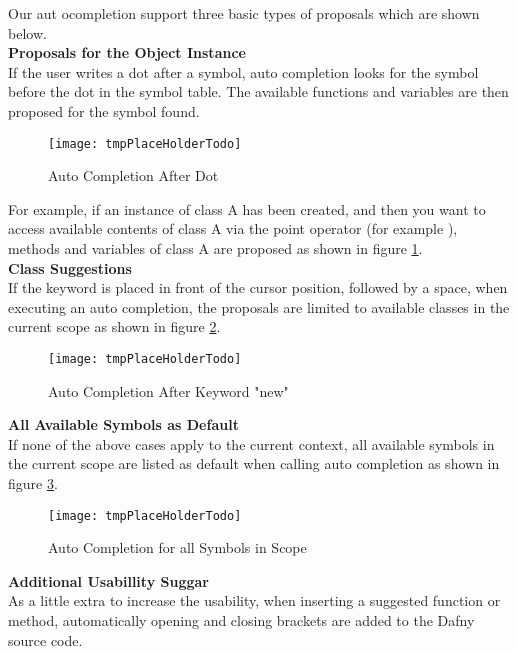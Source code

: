 Our aut ocompletion support three basic types of proposals which are shown below.\\

\textbf{Proposals for the Object Instance}\\
If the user writes a dot after a symbol,
auto completion looks for the symbol before the dot in the symbol table.
The available functions and variables are then proposed for the symbol found.

\begin{figure}[H]
    \centering
    \texttt{[image: tmpPlaceHolderTodo]}
    \caption{Auto Completion After Dot}
    \label{fig:result_completion_dot}
\end{figure}

For example, if an instance of class A has been created,
and then you want to access available contents of class A via the point operator
(for example ),
methods and variables of class A are proposed as shown in figure \ref{fig:result_completion_dot}. \\

\textbf{Class Suggestions}\\
If the keyword  is placed in front of the cursor position, followed by a space, when executing an auto completion,
the proposals are limited to available classes in the current scope as shown in figure \ref{fig:result_completion_new}.

\begin{figure}[H]
    \centering
    \texttt{[image: tmpPlaceHolderTodo]}
    \caption{Auto Completion After Keyword "new"}
    \label{fig:result_completion_new}
\end{figure}

\textbf{All Available Symbols as Default}\\
If none of the above cases apply to the current context,
all available symbols in the current scope are listed as default when calling auto completion
as shown in figure \ref{fig:result_completion_all}.

\begin{figure}[H]
    \centering
    \texttt{[image: tmpPlaceHolderTodo]}
    \caption{Auto Completion for all Symbols in Scope}
    \label{fig:result_completion_all}
\end{figure}

\textbf{Additional Usabillity Suggar}\\
As a little extra to increase the usability, when inserting a suggested function or method,
automatically opening and closing brackets are added to the Dafny source code.
  \\

